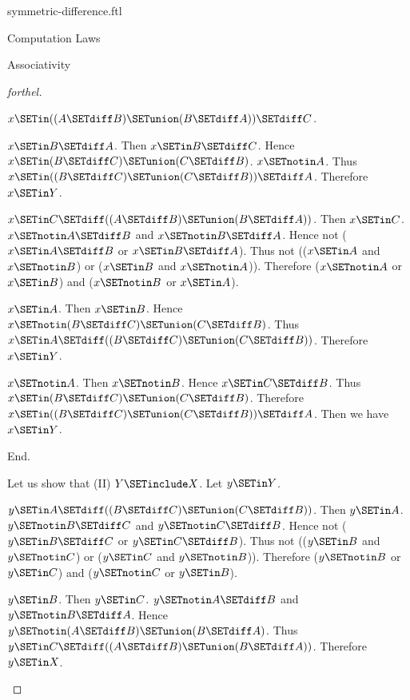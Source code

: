 \documentclass{stex}
\begin{document}
\begin{smodule}{symmetric-difference.ftl}
\begin{sfragment}{Computation Laws}
\begin{sfragment}{Associativity}
\begin{proof}[forthel]
\begin{case}{$x \SETin ((A \SETdiff B) \SETunion (B \SETdiff A)) \SETdiff C$.}
          \begin{case}{$x \SETin B \SETdiff A$.}
            Then $x \SETin B \SETdiff C$.
            Hence $x \SETin (B \SETdiff C) \SETunion (C \SETdiff B)$. $x \SETnotin A$.
            Thus $x \SETin ((B \SETdiff C) \SETunion (C \SETdiff B)) \SETdiff A$.
            Therefore $x \SETin Y$.
          \end{case}
        \end{case}

        \begin{case}{$x \SETin C \SETdiff ((A \SETdiff B) \SETunion (B \SETdiff A))$.}
          Then $x \SETin C$.
          $x \SETnotin A \SETdiff B$ and $x \SETnotin B \SETdiff A$.
          Hence not ($x \SETin A \SETdiff B$ or $x \SETin B \SETdiff A$).
          Thus not (($x \SETin A$ and $x \SETnotin B$) or ($x \SETin B$ and $x \SETnotin A$)).
          Therefore ($x \SETnotin A$ or $x \SETin B$) and ($x \SETnotin B$ or $x \SETin A$).

          \begin{case}{$x \SETin A$.}
            Then $x \SETin B$.
            Hence $x \SETnotin (B \SETdiff C) \SETunion (C \SETdiff B)$.
            Thus $x \SETin A \SETdiff ((B \SETdiff C) \SETunion (C \SETdiff B))$.
            Therefore $x \SETin Y$.
          \end{case}

          \begin{case}{$x \SETnotin A$.}
            Then $x \SETnotin B$.
            Hence $x \SETin C \SETdiff B$.
            Thus $x \SETin (B \SETdiff C) \SETunion (C \SETdiff B)$.
            Therefore $x \SETin ((B \SETdiff C) \SETunion (C \SETdiff B)) \SETdiff A$.
            Then we have $x \SETin Y$.
          \end{case}
        \end{case}
      End.

      Let us show that (II) $Y \SETinclude X$.
        Let $y \SETin Y$.

        \begin{case}{$y \SETin A \SETdiff ((B \SETdiff C) \SETunion (C \SETdiff B))$.}
          Then $y \SETin A$.
          $y \SETnotin B \SETdiff C$ and $y \SETnotin C \SETdiff B$.
          Hence not ($y \SETin B \SETdiff C$ or $y \SETin C \SETdiff B$).
          Thus not (($y \SETin B$ and $y \SETnotin C$) or ($y \SETin C$ and $y \SETnotin B$)).
          Therefore ($y \SETnotin B$ or $y \SETin C$) and ($y \SETnotin C$ or $y \SETin B$).

          \begin{case}{$y \SETin B$.}
            Then $y \SETin C$.
            $y \SETnotin A \SETdiff B$ and $y \SETnotin B \SETdiff A$.
            Hence $y \SETnotin (A \SETdiff B) \SETunion (B \SETdiff A)$.
            Thus $y \SETin C \SETdiff ((A \SETdiff B) \SETunion (B \SETdiff A))$.
            Therefore $y \SETin X$.
          \end{case}


\end{case}
\end{proof}
\end{sfragment}
\end{sfragment}
\end{smodule}
\end{document}
